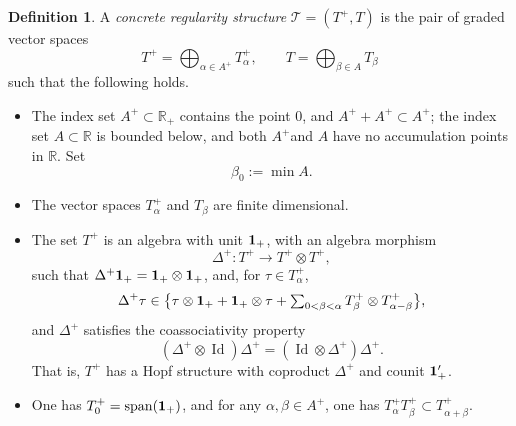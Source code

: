 \documentclass[11pt]{article}
\numberwithin{equation}{section}
\DeclareMathOperator{\Span}{span}
\theoremstyle{plain}
\theoremstyle{definition}
\newtheorem*{defn*} {Definition}
\DeclareMathOperator{\iden}{Id}
\newcommand{\bbR}{\mathbb{R}}
\begin{document}
\begin{defn*}
A \emph{{concrete regularity structure}} $\mathscr{T}=(T^+,T)$ is the pair of graded vector spaces\vspace*{-3pt}
\[
T^+ = \bigoplus_{\alpha\in A^+} T_\alpha^+, \qquad T = \bigoplus_{\beta\in A} T_\beta
\]
such that the following holds.
\begin{itemize}
\item The index set $A^{+}\subset \bbR_+$ contains the point $0$, and $A^++A^+ \subset A^+$; the index set $A\subset\bbR$ is bounded below, and both $A^+$and $A$ have no accumulation points in $\bbR$. Set\vspace*{-3pt}
\[
\beta_0 := \min A.
\]

\item The vector spaces $T_\alpha^+$ and $T_\beta$ are finite dimensional.

\item The set $T^+$ is an algebra with unit $\bf 1_+$, with an algebra morphism\vspace*{-3pt}
\[
\Delta^+ : T^+\to T^+\otimes T^+,
\]
such that $\Delta^+{\bf 1}_+ = {\bf 1}_+\otimes {\bf 1}_+$, and, for $\tau\in T_\alpha^+$,\vspace*{-3pt}
\begin{equation} \label{EqDefnDeltaPlus}
\Delta^+\tau \in \bigl\{\tau\otimes {\bf 1}_+ + {\bf 1}_+\otimes \tau + \textstyle\sum_{0<\beta<\alpha} T^+_\beta\otimes T^+_{\alpha-\beta}\bigr\},
\end{equation}
and $\Delta^+$ satisfies the coassociativity property\vspace*{-3pt}
\[
(\Delta^+\otimes\iden )\Delta^+ = (\iden \otimes\Delta^+)\Delta^+.
\]
That is, $T^+$ has a Hopf structure with coproduct $\Delta^+$ and counit ${\bf1}_+'$.

\item One has $T_0^+ = \Span({\bf 1}_+)$, and for any $\alpha,\beta\in A^+$, one has $T_\alpha^+ T_\beta^+ \subset T_{\alpha+\beta}^+$.


\end{itemize}
\end{defn*}
\end{document}

